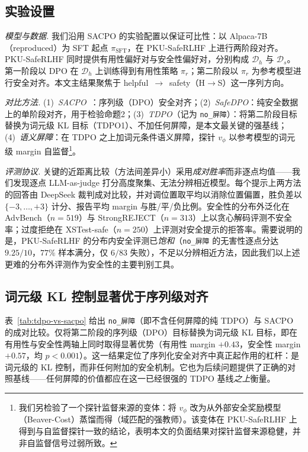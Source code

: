 \documentclass[lettersize,journal]{IEEEtran}
\begin{document}
\subsection{实验设置}\label{exp:setup}
\textit{模型与数据.} 我们沿用 SACPO 的实验配置以保证可比性：以 Alpaca-7B（reproduced）为 SFT 起点 $\pi_{\text{SFT}}$，在 PKU-SafeRLHF 上进行两阶段对齐。PKU-SafeRLHF 同时提供有用性偏好对与安全性偏好对，分别构成 $\mathcal{D}_h$ 与 $\mathcal{D}_s$。第一阶段以 DPO 在 $\mathcal{D}_h$ 上训练得到有用性策略 $\pi_r$；第二阶段以 $\pi_r$ 为参考模型进行安全对齐。本文主结果聚焦于 helpful~$\to$~safety（H$\to$S）这一序列方向。

\textit{对比方法.} (1)~\emph{SACPO}~\cite{wachi2024stepwise}：序列级（DPO）安全对齐；(2)~\emph{SafeDPO}：纯安全数据上的单阶段对齐，用于检验命题2；(3)~\emph{TDPO}（记为 \texttt{no\_屏障}）：将第二阶段目标替换为词元级 KL 目标（TDPO1）、不加任何屏障，是本文最关键的强基线；(4)~\emph{语义屏障}：在 TDPO 之上加词元条件语义屏障，探针 $v_\phi$ 以参考模型的词元级 margin 自监督\footnote{我们另检验了一个探针监督来源的变体：将 $v_\phi$ 改为从外部安全奖励模型（Beaver-Cost）蒸馏而得（域匹配的强教师）。该变体在 PKU-SafeRLHF 上得到与自监督探针一致的结论，表明本文的负面结果对探针监督来源稳健，并非自监督信号过弱所致。}。

\textit{评测协议.} 关键的近距离比较（方法间差异小）采用\emph{成对胜率}而非逐点均值——我们发现逐点 LLM-as-judge 打分高度聚集、无法分辨相近模型。每个提示上两方法的回答由 DeepSeek 裁判成对比较，并对调位置取平均以消除位置偏置，胜负差以 $\{-3,\dots,+3\}$ 计分、报告平均 margin 与胜/平/负比例。安全性的分布外泛化在 AdvBench（$n{=}519$）与 StrongREJECT（$n{=}313$）上以贪心解码评测不安全率；过度拒绝在 XSTest-safe（$n{=}250$）上评测对安全提示的拒答率。需要说明的是，PKU-SafeRLHF 的分布内安全评测已\emph{饱和}（\texttt{no\_屏障} 的无害性逐点分达 $9.25/10$，$77\%$ 样本满分，仅 $6/83$ 失败），不足以分辨相近方法，因此我们以上述更难的分布外评测作为安全性的主要判别工具。

\subsection{词元级 KL 控制显著优于序列级对齐}\label{exp:tdpo}
表~\ref{tab:tdpo-vs-sacpo} 给出 \texttt{no\_屏障}（即不含任何屏障的纯 TDPO）与 SACPO 的成对比较。仅将第二阶段的序列级（DPO）目标替换为词元级 KL 目标，即在有用性与安全性两轴上同时取得显著优势（有用性 margin $+0.43$，安全性 margin $+0.57$，均 $p<0.001$）。这一结果定位了序列化安全对齐中真正起作用的杠杆：是词元级的 KL 控制，而非任何附加的安全机制。它也为后续问题提供了正确的对照基线——任何屏障的价值都应在这一已经很强的 TDPO 基线\emph{之上}衡量。
\end{document}
